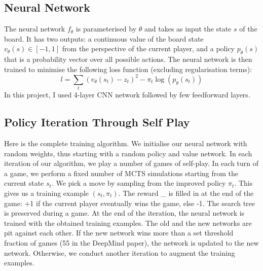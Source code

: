 \documentclass{article} %
\begin{document}
    \subsection{Neural Network}
    The neural network $f_\theta$ is parameterised by $\theta$ and takes as input the state $s$ of the board. It has two outputs: a continuous value of the board state 
    $v_\theta(s) \in [-1, 1]$ from the perspective of the current player, and a policy $p_{\theta}(s)$ that is a probability vector over all possible actions.
    The neural network is then trained to minimise the following loss function (excluding regularisation terms):
    $$
    l = \sum_{t}(v_\theta(s_t)-z_t)^2 - \pi_{t} \log(p_\theta(s_t))
    $$
    In this project, I used 4-layer CNN network followed by few feedforward layers.

    \subsection{Policy Iteration Through Self Play}
    Here is the complete training algorithm. We initialise our neural network with random weights, thus starting with a random policy and value network. 
    In each iteration of our algorithm, we play a number of games of self-play. In each turn of a game, we perform a fixed number of MCTS simulations starting from the current state $s_t$.
    We pick a move by sampling from the improved policy $\pi_{t}$. This gives us a training example $(s_t, \pi_{t})$. 
    The reward \_ is filled in at the end of the game: +1 if the current player eventually wins the game, else -1. The search tree is preserved during a game.
    At the end of the iteration, the neural network is trained with the obtained training examples. The old and the new networks are pit against each other. 
    If the new network wins more than a set threshold fraction of games (55 in the DeepMind paper), the network is updated to the new network.
    Otherwise, we conduct another iteration to augment the training examples.
    
\end{document}
